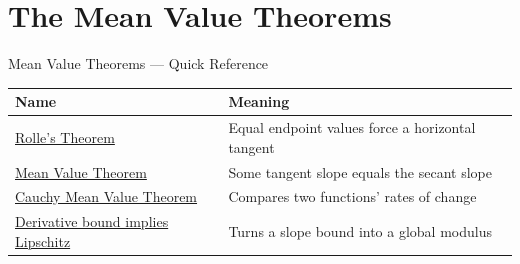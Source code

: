 \section{The Mean Value Theorems}

\begin{toolkitbox}{Mean Value Theorems --- Quick Reference}
\small
\begin{tabular}{l l}
\toprule
\textbf{Name} & \textbf{Meaning} \\
\midrule
\hyperref[thm:rolles-theorem]{Rolle's Theorem} & Equal endpoint values force a horizontal tangent \\
\hyperref[thm:mean-value-theorem]{Mean Value Theorem} & Some tangent slope equals the secant slope \\
\hyperref[thm:cauchy-mean-value-theorem]{Cauchy Mean Value Theorem} & Compares two functions' rates of change \\
\hyperref[cor:derivative-bound-implies-lipschitz]{Derivative bound implies Lipschitz} & Turns a slope bound into a global modulus \\
\bottomrule
\end{tabular}
\end{toolkitbox}


